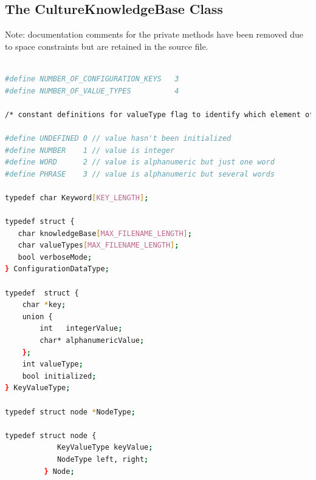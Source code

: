 \documentclass{CSSRforAfrica}
\begin{document}
\newpage
\begin{appendices}

\section{The CultureKnowledgeBase Class}
\label{appendix:helper_class}  

Note: documentation comments for the private methods have been removed due to space constraints but are retained in the source file.

\begin{lstlisting}[style=withoutNumbering, language=bash]

#define NUMBER_OF_CONFIGURATION_KEYS   3
#define NUMBER_OF_VALUE_TYPES          4

/* constant definitions for valueType flag to identify which element of the union is to be used */

#define UNDEFINED 0 // value hasn't been initialized
#define NUMBER    1 // value is integer
#define WORD      2 // value is alphanumeric but just one word
#define PHRASE    3 // value is alphanumeric but several words

typedef char Keyword[KEY_LENGTH];

typedef struct {
   char knowledgeBase[MAX_FILENAME_LENGTH];
   char valueTypes[MAX_FILENAME_LENGTH];
   bool verboseMode;
} ConfigurationDataType;

typedef  struct {
    char *key;
    union {
        int   integerValue;
        char* alphanumericValue;  
    };
    int valueType;
    bool initialized;
} KeyValueType;

typedef struct node *NodeType;

typedef struct node {
            KeyValueType keyValue;
            NodeType left, right;
         } Node;


\end{lstlisting}
\end{appendices}
\end{document}
